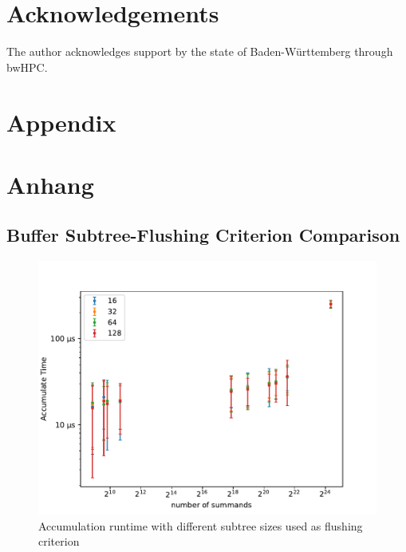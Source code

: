 
\chapter{Acknowledgements}
The author acknowledges support by the state of Baden-Württemberg through bwHPC.

\printglossary[type=\acronymtype]
\printglossary

{\chapter{Appendix}}    %
{\chapter{Anhang}}      %
\label{chap:appendix}

\section{Buffer Subtree-Flushing Criterion Comparison}

\begin{figure}[H]
\centering
\includegraphics[scale=0.8]{figures/bufferSizes.pdf}
\caption{Accumulation runtime with different subtree sizes used as flushing criterion}
\label{fig:bufferFlushingCriterion}
\end{figure}


